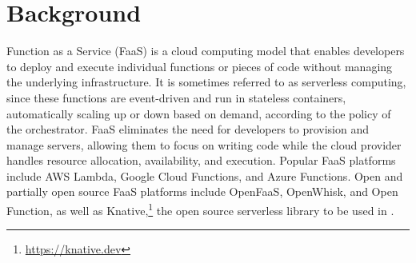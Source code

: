 \section{Background}
\label{sec:background}

%
Function as a Service (FaaS) is a cloud computing model that enables developers
to deploy and execute individual functions or pieces of code without managing
the underlying infrastructure.
%
It is sometimes referred to as serverless computing, since these functions are
event-driven and run in stateless containers, automatically scaling up or down
based on demand, according to the policy of the orchestrator.
%
FaaS eliminates the need for developers to
provision and manage servers, allowing them to focus on writing code while the
cloud provider handles resource allocation, availability, and execution.
%
Popular FaaS platforms include AWS Lambda, Google Cloud Functions, and Azure
Functions.  Open and partially open source FaaS platforms include OpenFaaS,
OpenWhisk, and Open Function, as well as Knative,\footnote{\url{https://knative.dev}}
the open source serverless library to be used in \SystemName.





